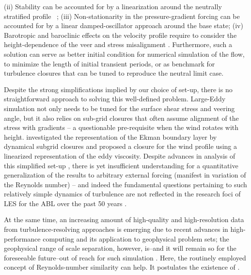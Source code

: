 \documentclass[a4paper,11pt]{amsart}
\begin{document}
%
(ii) Stability can be accounted for by a linearization around the neutrally stratified profile~%
\citep{monin:ARF1970, monin:1975, hogstrom:BM1988, hogstrom:BM1996,sakagami:BM2020};
%
(iii) Non-stationarity in the pressure-gradient forcing can be accounted for by a linear damped-oscillator
approach around the base state\citep{momen:JAS2016}; 
%
(iv) Barotropic and baroclinic effects on the velocity profile require to consider 
the height-dependence of the veer and stress misalignment \citep{momen:JAS2018, ghannam:QJR2021}.
% 
Furthermore, such a solution can serve as better initial condition for numerical simulation of the flow,
to minimize the length of initial transient periods, or as benchmark for turbulence
closures that can be tuned to reproduce the neutral limit case.
%
\par
%
Despite the strong simplifications implied by our choice of set-up, there is no straightforward approach to solving
this well-defined problem.
%
Large-Eddy simulation not only needs to be tuned for the surface shear stress and veering angle, but it also
relies on sub-grid closures that often assume alignment of the stress with gradients -- a questionable
pre-requisite when the wind rotates with height.
%
\citet{esau:EFM2004} investigated the representation of the Ekman boundary layer by dynamical subgrid closures
and \cite{zikanov:JFM2003} proposed a closure for the wind profile using a linearized representation of the eddy viscosity.
%
Despite advances in analysis of this simplified set-up \citep{jiang:JAS2018}, 
there is yet insufficient understanding for a quantitative generalization of the results to
arbitrary external forcing (manifest in variation of the Reynolds number) -- and indeed the fundamental
questions pertaining to such relatively simple dynamics of turbulence are not reflected in the
research foci of LES for the ABL over the past 50 years \citep{stoll:BM2020}. 
%
\par
% 
At the same time, an increasing amount of high-quality and high-resolution data from turbulence-resolving approaches
is emerging due to recent advances in high-performance computing and its application to geophysical problem sets;
the geophysical range of scale separation, however, is--and it will remain so for the foreseeable future--out of reach
for such simulation \citep{dimotakis:ARF2005}.
%
Here, the routinely employed concept of Reynolds-number similarity can help. It postulates the existence
of 
\citep{barenblatt:PF1995}.
\end{document}
